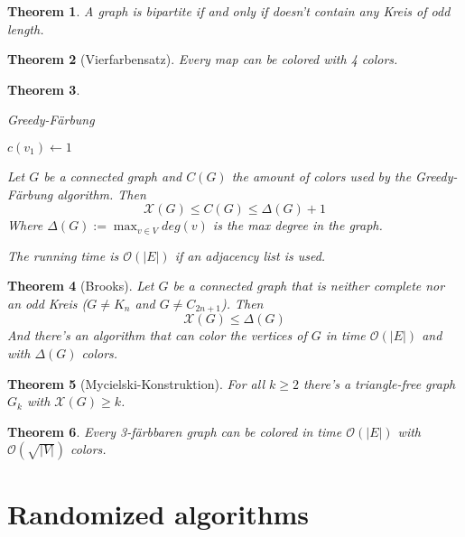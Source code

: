 \documentclass[12pt]{extarticle}
\theoremstyle{definition}
\theoremstyle{remark}
\theoremstyle{plain}
\newtheorem{theorem}{Theorem}
\newcommand{\BO}{\mathcal{O}}
\begin{document}
\begin{theorem}
    A graph is bipartite if and only if doesn't contain any Kreis of odd length.
\end{theorem}

\begin{theorem}[Vierfarbensatz]
    Every map can be colored with 4 colors.
\end{theorem}

\begin{theorem}
    \begin{algorithm}
        \caption{Greedy-Färbung}
        $c(v_1) \gets 1$\;
    \end{algorithm}

    Let $G$ be a connected graph and $C(G)$ the amount of colors used by the Greedy-Färbung algorithm.
    Then
    \[ \mathcal{X}(G) \le C(G) \le \Delta(G) + 1 \]
    Where $\Delta(G) := \max_{v \in V} deg(v)$ is the max degree in the graph.

    The running time is $\BO(|E|)$ if an adjacency list is used.
\end{theorem}

\begin{theorem}[Brooks]
    Let $G$ be a connected graph that is neither complete nor an odd Kreis ($G \ne K_n$ and $G \ne C_{2n+1}$).
    Then
    \[ \mathcal{X}(G) \le \Delta(G) \]
    And there's an algorithm that can color the vertices of $G$ in time $\BO(|E|)$ and with $\Delta(G)$ colors.
\end{theorem}

\begin{theorem}[Mycielski-Konstruktion]
    For all $k \ge 2$ there's a triangle-free graph $G_k$ with $\mathcal{X}(G) \ge k$.
\end{theorem}

\begin{theorem}
    Every 3-färbbaren graph can be colored in time $\BO(|E|)$ with $\BO(\sqrt{|V|})$ colors.
\end{theorem}

\section{Randomized algorithms}
\end{document}
